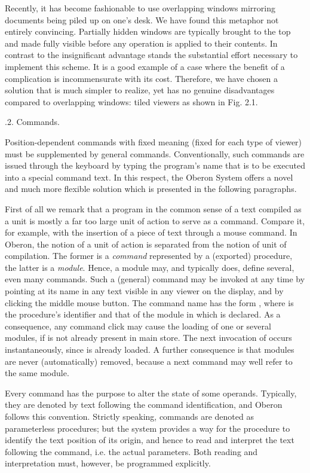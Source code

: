 Recently, it has become fashionable to use overlapping windows
mirroring documents being piled up on one's desk. We have found this
metaphor not entirely convincing. Partially hidden windows are
typically brought to the top and made fully visible before any
operation is applied to their contents. In contrast to the
insignificant advantage stands the substantial effort necessary to
implement this scheme. It is a good example of a case where the
benefit of a complication is incommensurate with its cost. Therefore,
we have chosen a solution that is much simpler to realize, yet has no
genuine disadvantages compared to overlapping windows: tiled viewers
as shown in Fig. 2.1.


.2. Commands.

Position-dependent commands with fixed meaning (fixed
for each type of viewer) must be supplemented by general
commands. Conventionally, such commands are issued through the
keyboard by typing the program's name that is to be executed into a
special command text. In this respect, the Oberon System offers a
novel and much more flexible solution which is presented in the
following paragraphs.

First of all we remark that a program in the
common sense of a text compiled as a unit is mostly a far too large
unit of action to serve as a command. Compare it, for example, with
the insertion of a piece of text through a mouse command. In Oberon,
the notion of a unit of action is separated from the notion of unit of
compilation. The former is a \emph{command} represented by a (exported)
procedure, the latter is a \emph{module}. Hence, a module may, and typically
does, define several, even many commands. Such a (general) command may be invoked at any time by pointing at its name in any text visible in any viewer on the display, and by clicking the middle mouse button. The command name has the form , where  is the procedure's identifier and  that of the module in which  is declared. As a consequence, any command click may cause the loading of one or several modules, if  is not already present in main store. The next invocation of  occurs instantaneously, since  is already loaded. A further consequence is that modules are never (automatically) removed, because a next command may well refer to the same module.


Every command has the purpose to alter the state of some
operands. Typically, they are denoted by text following the command
identification, and Oberon follows this convention. Strictly speaking,
commands are denoted as parameterless procedures; but the system
provides a way for the procedure to identify the text position of its
origin, and hence to read and interpret the text following the
command, i.e. the actual parameters. Both reading and interpretation
must, however, be programmed explicitly.

